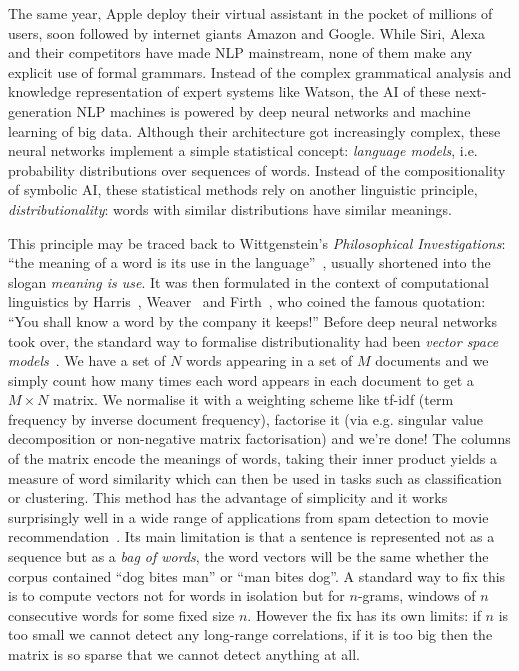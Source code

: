 The same year, Apple deploy their virtual assistant in the pocket of millions of users, soon followed by internet giants Amazon and Google.
While Siri, Alexa and their competitors have made NLP mainstream, none of them make any explicit use of formal grammars.
Instead of the complex grammatical analysis and knowledge representation of expert systems like Watson, the AI of these next-generation NLP machines is powered by deep neural networks and machine learning of big data.
Although their architecture got increasingly complex, these neural networks implement a simple statistical concept: \emph{language models}, i.e. probability distributions over sequences of words.
Instead of the compositionality of symbolic AI, these statistical methods rely on another linguistic principle, \emph{distributionality}: words with similar distributions have similar meanings.

This principle may be traced back to Wittgenstein's \emph{Philosophical Investigations}: ``the meaning of a word is its use in the language''~\cite{Wittgenstein53}, usually shortened into the slogan \emph{meaning is use}.
It was then formulated in the context of computational linguistics by Harris~\cite{Harris54}, Weaver~\cite{Weaver55} and Firth~\cite{Firth57}, who coined the famous quotation: ``You shall know a word by the company it keeps!''
Before deep neural networks took over, the standard way to formalise distributionality had been \emph{vector space models}~\cite{SaltonEtAl75}.
We have a set of $N$ words appearing in a set of $M$ documents and we simply count how many times each word appears in each document to get a $M \times N$ matrix.
We normalise it with a weighting scheme like tf-idf (term frequency by inverse document frequency), factorise it (via e.g. singular value decomposition or non-negative matrix factorisation) and we're done!
The columns of the matrix encode the meanings of words, taking their inner product yields a measure of word similarity which can then be used in tasks such as classification or clustering.
This method has the advantage of simplicity and it works surprisingly well in a wide range of applications from spam detection to movie recommendation~\cite{TurneyPantel10}.
Its main limitation is that a sentence is represented not as a sequence but as a \emph{bag of words}, the word vectors will be the same whether the corpus contained ``dog bites man'' or ``man bites dog''.
A standard way to fix this is to compute vectors not for words in isolation but for $n$-grams, windows of $n$ consecutive words for some fixed size $n$.
However the fix has its own limits: if $n$ is too small we cannot detect any long-range correlations, if it is too big then the matrix is so sparse that we cannot detect anything at all.

